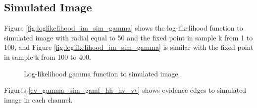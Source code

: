 \documentclass[journal]{IEEEtran}
\begin{document}
\subsection{Simulated Image}
Figure \eqref{fig:loglikelihood_im_sim_gamma} shows the log-likelihood function to simulated image with radial equal to 50 and the fixed point in sample k from 1 to 100, and Figure \eqref{fig:loglikelihood_im_sim_gamma} is similar with the fixed point in sample k from 100 to 400.
   \begin{figure}[hbt]
   \centering
    \caption{Log-likelihood gamma function to simulated image.} \label{fig:loglikelihood_im_sim_gamma}   
\end{figure}


Figures \eqref{ev_gamma_sim_gamf_hh_hv_vv} shows evidence edges to simulated image in each channel. 
\end{document}
